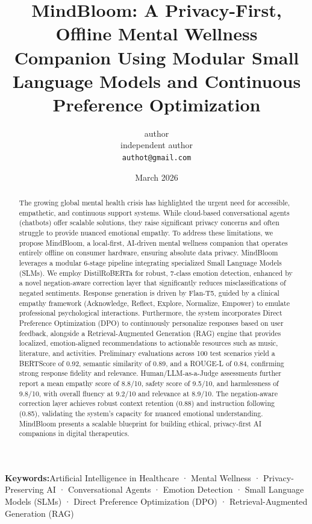 \documentclass[12pt,twoside]{article}
\title{\textbf{MindBloom: A Privacy-First, Offline Mental Wellness Companion Using Modular Small Language Models and Continuous Preference Optimization}}
\author{
  author\\
  independent author\\
  \texttt{authot@gmail.com}
}
\date{March 2026}
\begin{document}
\maketitle

\begin{abstract}
The growing global mental health crisis has highlighted the urgent need for accessible, empathetic, and continuous support systems. While cloud-based conversational agents (chatbots) offer scalable solutions, they raise significant privacy concerns and often struggle to provide nuanced emotional empathy. To address these limitations, we propose MindBloom, a local-first, AI-driven mental wellness companion that operates entirely offline on consumer hardware, ensuring absolute data privacy. MindBloom leverages a modular 6-stage pipeline integrating specialized Small Language Models (SLMs). We employ DistilRoBERTa for robust, 7-class emotion detection, enhanced by a novel negation-aware correction layer that significantly reduces misclassifications of negated sentiments. Response generation is driven by Flan-T5, guided by a clinical empathy framework (Acknowledge, Reflect, Explore, Normalize, Empower) to emulate professional psychological interactions. Furthermore, the system incorporates Direct Preference Optimization (DPO) to continuously personalize responses based on user feedback, alongside a Retrieval-Augmented Generation (RAG) engine that provides localized, emotion-aligned recommendations to actionable resources such as music, literature, and activities. Preliminary evaluations across 100 test scenarios yield a BERTScore of 0.92, semantic similarity of 0.89, and a ROUGE-L of 0.84, confirming strong response fidelity and relevance. Human/LLM-as-a-Judge assessments further report a mean empathy score of 8.8/10, safety score of 9.5/10, and harmlessness of 9.8/10, with overall fluency at 9.2/10 and relevance at 8.9/10. The negation-aware correction layer achieves robust context retention (0.88) and instruction following (0.85), validating the system's capacity for nuanced emotional understanding. MindBloom presents a scalable blueprint for building ethical, privacy-first AI companions in digital therapeutics.
\end{abstract}

\textbf{Keywords:}Artificial Intelligence in Healthcare · Mental Wellness · Privacy-Preserving AI · Conversational Agents · Emotion Detection · Small Language Models (SLMs) · Direct Preference Optimization (DPO) · Retrieval-Augmented Generation (RAG)
\end{document}
